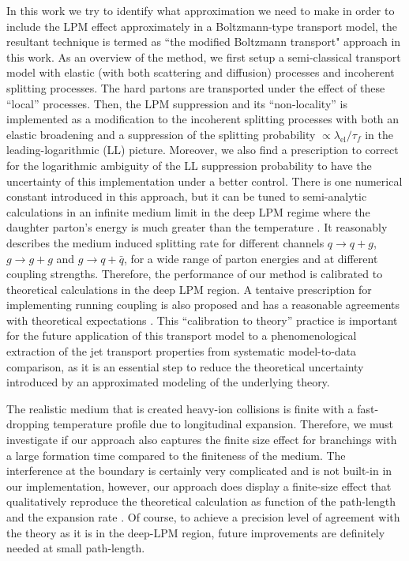 \documentclass[aps, prc, reprint, amsmath, groupedaddress, nofootinbib]{revtex4-1}
\begin{document}
In this work we try to identify what approximation we need to make in order to include the LPM effect approximately in a Boltzmann-type transport model, the resultant technique is termed as ``the modified Boltzmann transport" approach in this work. 
As an overview of the method, we first setup a semi-classical transport model with elastic (with both scattering and diffusion) processes and incoherent splitting processes.
The hard partons are transported under the effect of these ``local'' processes.
Then, the LPM suppression and its ``non-locality'' is implemented as a modification to the incoherent splitting processes with both an elastic broadening and a suppression of the splitting probability $\propto \lambda_{\textrm{el}}/\tau_f$ in the leading-logarithmic (LL) picture.
Moreover, we also find a prescription to correct for the logarithmic ambiguity of the LL suppression probability to have the uncertainty of this implementation under a better control.
There is one numerical constant introduced in this approach, but it can be tuned to semi-analytic calculations in an infinite medium limit in the deep LPM regime where the daughter parton's energy is much greater than the temperature \cite{Arnold:2008zu}.
It reasonably describes the medium induced splitting rate for different channels $q\rightarrow q+g$, $g\rightarrow g+g$ and $g\rightarrow q+\bar{q}$, for a wide range of parton energies and at different coupling strengths.
Therefore, the performance of our method is calibrated to theoretical calculations in the deep LPM region.
A tentaive prescription for implementing running coupling is also proposed and has a reasonable agreements with theoretical expectations \cite{Arnold:2009mr}.
This ``calibration to theory'' practice is important for the future application of this transport model to a phenomenological extraction of the jet transport properties from systematic model-to-data comparison, as it is an essential step to reduce the theoretical uncertainty introduced by an approximated modeling of the underlying theory.

The realistic medium that is created heavy-ion collisions is finite with a fast-dropping temperature profile due to longitudinal expansion. 
Therefore, we must investigate if our approach also captures the finite size effect  for branchings with a large formation time compared to the finiteness of the medium.
The interference at the boundary is certainly very complicated and is not built-in in our implementation, however, our approach does display a finite-size effect that qualitatively reproduce the theoretical calculation as function of the path-length and the expansion rate \cite{CaronHuot:2010bp, Baier:1998yf}.
Of course, to achieve a precision level of agreement with the theory as it is in the deep-LPM region, future improvements are definitely needed at small path-length.
\end{document}
